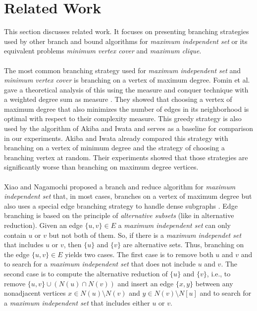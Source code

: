 \documentclass[]{article}
\begin{document}
\newpage
\section{Related Work} \label{sec3}

This section discusses related work. It focuses on presenting branching strategies used by other branch and bound algorithms for \textit{maximum independent set} or its equivalent problems \textit{minimum vertex cover} and \textit{maximum clique}.\\\\
The most common branching strategy used for \textit{maximum independent set} and \textit{minimum vertex cover} is branching on a vertex of maximum degree. Fomin et al. gave a theoretical analysis of this using the measure and conquer technique with a weighted degree sum as measure \cite{Fomin}. They showed that choosing a vertex of maximum degree that also minimizes the number of edges in its neighborhood is optimal with respect to their complexity measure. This greedy strategy is also used by the algorithm of Akiba and Iwata\cite{AkibaIwata} and serves as a baseline for comparison in our experiments. Akiba and Iwata already compared this strategy with branching on a vertex of minimum degree and the strategy of choosing a branching vertex at random. Their experiments showed that those strategies are significantly worse than branching on maximum degree vertices.\\\\
Xiao and Nagamochi proposed a branch and reduce algorithm for \textit{maximum independent set} that, in most cases, branches on a vertex of maximum degree but also uses a special edge branching strategy to handle dense subgraphs \cite{XiaoNagamochi}. Edge branching is based on the principle of \textit{alternative subsets} (like in alternative reduction). Given an edge $\{u,v\}\in E$ a \textit{maximum independent set} can only contain $u$ or $v$ but not both of them. So, if there is a \textit{maximum independet set} that includes $u$ or $v$, then $\{u\}$ and $\{v\}$ are alternative sets. Thus, branching on the edge $\{u,v\}\in E$ yields two cases. The first case is to remove both $u$ and $v$ and to search for a \textit{maximum independent set} that does not include $u$ and $v$. The second case is to compute the alternative reduction of $\{u\}$ and $\{v\}$, i.e., to remove $\{u,v\}\cup(N(u)\cap N(v))$ and insert an edge $\{x,y\}$ between any nonadjacent vertices $x\in N(u)\setminus N(v)$ and $y\in N(v)\setminus N[u]$ and to search for a \textit{maximum independent set} that includes either $u$ or $v$.\\
\end{document}
